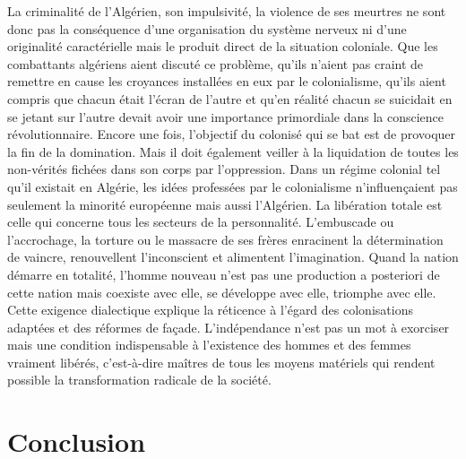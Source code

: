 \documentclass[french,twoside]{book} %
\newcommand\chapteropen{} %
\newcommand\chapterclose{} %
\begin{document}
La criminalité de l’Algérien, son impulsivité, la violence de ses meurtres ne sont donc pas la conséquence d’une organisation du système nerveux ni d’une originalité caractérielle mais le produit direct de la situation coloniale. Que les combattants algériens aient discuté ce problème, qu’ils n’aient pas craint de remettre en cause les croyances installées en eux par le colonialisme, qu’ils aient compris que chacun était l’écran de l’autre et qu’en réalité chacun se suicidait en se jetant sur l’autre devait avoir une importance primordiale dans la conscience révolutionnaire. Encore une fois, l’objectif du colonisé qui se bat est de provoquer la fin de la domination. Mais il doit également veiller à la liquidation de toutes les non-vérités fichées dans son corps par l’oppression. Dans un régime colonial tel qu’il existait en Algérie, les idées professées par le colonialisme n’influençaient pas seulement la minorité européenne mais aussi l’Algérien. La libération totale est celle qui concerne tous les secteurs de la personnalité. L’embuscade ou l’accrochage, la torture ou le massacre de ses frères enracinent la détermination de vaincre, renouvellent l’inconscient et alimentent l’imagination. Quand la nation démarre en totalité, l’homme nouveau n’est pas une production a posteriori de cette nation mais coexiste avec elle, se développe avec elle, triomphe avec elle. Cette exigence dialectique explique la réticence à l’égard des colonisations adaptées et des réformes de façade. L’indépendance n’est pas un mot à exorciser mais une condition indispensable à l’existence des hommes et des femmes vraiment libérés, c’est-à-dire maîtres de tous les moyens matériels qui rendent possible la transformation radicale de la société.\par
 \chapterclose


\chapteropen
\chapter[{Conclusion}]{Conclusion}\renewcommand{\leftmark}{Conclusion}
\end{document}
